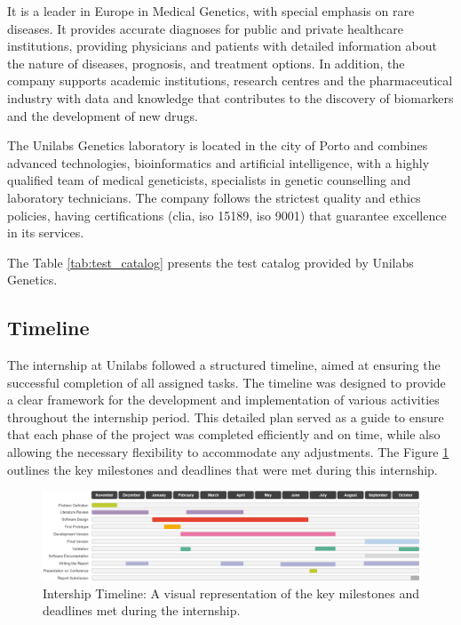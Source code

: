 It is a leader in Europe in Medical Genetics, with special emphasis on rare diseases. It provides accurate diagnoses for public and private healthcare institutions, providing physicians and patients with detailed information about the nature of diseases, prognosis, and treatment options. In addition, the company supports academic institutions, research centres and the pharmaceutical industry with data and knowledge that contributes to the discovery of biomarkers and the development of new drugs. \cite{unilabs_genetica}

The Unilabs Genetics laboratory is located in the city of Porto and combines advanced technologies, bioinformatics and artificial intelligence, with a highly qualified team of medical geneticists, specialists in genetic counselling and laboratory technicians. The company follows the strictest quality and ethics policies, having certifications (\ac{clia}, \ac{iso} 15189, \ac{iso} 9001) that guarantee excellence in its services. \cite{unilabs_genetica}

The Table \ref{tab:test_catalog} presents the test catalog provided by Unilabs Genetics.

\subsection{Timeline} \label{subsec:timeline}
The internship at Unilabs followed a structured timeline, aimed at ensuring the successful completion of all assigned tasks. The timeline was designed to provide a clear framework for the development and implementation of various activities throughout the internship period. This detailed plan served as a guide to ensure that each phase of the project was completed efficiently and on time, while also allowing the necessary flexibility to accommodate any adjustments. The Figure \ref{fig:timeline1} outlines the key milestones and deadlines that were met during this internship.

\begin{figure}[H]
    \centering
    \includegraphics[width=1\textwidth]{figs/timeline2.png}
    \caption{Intership Timeline: A visual representation of the key milestones and deadlines met during the internship.}
    \label{fig:timeline1}
\end{figure}

